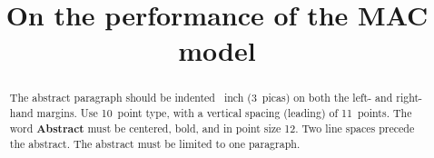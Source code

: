 \documentclass{article}
\title{On the performance of the MAC model}
\author{}
\begin{document}

\maketitle

\begin{abstract}
  The abstract paragraph should be indented ~inch
  (3~picas) on both the left- and right-hand margins. Use 10~point
  type, with a vertical spacing (leading) of 11~points.  The word
  \textbf{Abstract} must be centered, bold, and in point size 12. Two
  line spaces precede the abstract. The abstract must be limited to
  one paragraph.
\end{abstract}








\end{document}
